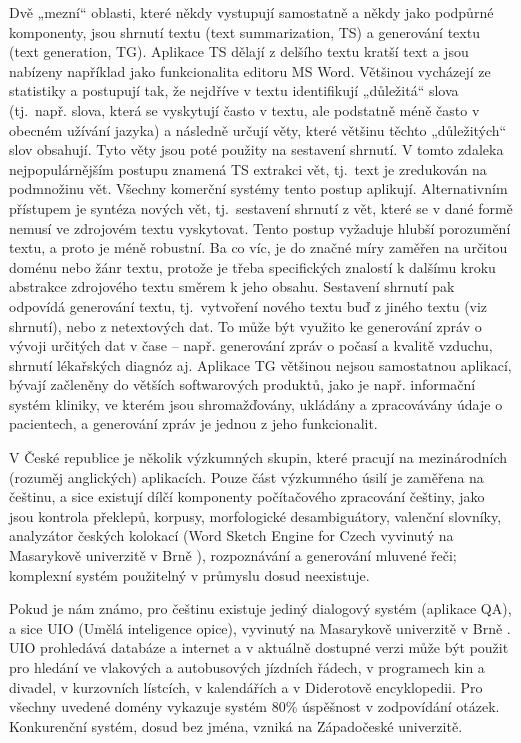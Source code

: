 \begin{multicols}{2}
Dvě „mezní“ oblasti, které někdy vystupují samostatně a někdy jako podpůrné komponenty, jsou shrnutí textu (text summarization, TS) a generování textu (text generation, TG). Aplikace TS dělají z delšího textu kratší text a jsou nabízeny například jako funkcionalita editoru MS Word. Většinou vycházejí ze statistiky a postupují tak, že nejdříve v textu identifikují „důležitá“ slova (tj.~např. slova, která se vyskytují často v textu, ale podstatně méně často v obecném užívání jazyka) a následně určují věty, které většinu těchto „důležitých“ slov obsahují. Tyto věty jsou poté použity na sestavení shrnutí. V tomto zdaleka nejpopulárnějším postupu znamená TS extrakci vět, tj.~text je zredukován na podmnožinu vět. Všechny komerční systémy tento postup aplikují.
Alternativním přístupem je syntéza nových vět, tj.~sestavení shrnutí z vět, které se v dané formě nemusí ve zdrojovém textu vyskytovat. Tento postup vyžaduje hlubší porozumění textu, a proto je méně robustní. Ba co víc, je do značné míry zaměřen na určitou doménu nebo žánr textu, protože je třeba specifických znalostí k dalšímu kroku abstrakce zdrojového textu směrem k jeho obsahu. Sestavení shrnutí pak odpovídá generování textu, tj.~vytvoření nového textu buď z jiného textu (viz shrnutí), nebo z netextových dat. To může být využito ke generování zpráv o vývoji určitých dat v čase -- např. generování zpráv o počasí a kvalitě vzduchu, shrnutí lékařských diagnóz aj. Aplikace TG většinou nejsou samostatnou aplikací, bývají začleněny do větších softwarových produktů, jako je např. informační systém kliniky, ve kterém jsou shromažďovány, ukládány a zpracovávány údaje o pacientech, a generování zpráv je jednou z jeho funkcionalit.

V České republice je několik výzkumných skupin, které pracují na mezinárodních (rozuměj anglických) aplikacích. Pouze část výzkumného úsilí je zaměřena na češtinu, a sice existují dílčí komponenty počítačového zpracování češtiny, jako jsou kontrola překlepů, korpusy, morfologické desambiguátory, valenční slovníky, analyzátor českých kolokací (Word Sketch Engine for Czech vyvinutý na Masarykově univerzitě v Brně \cite{Horak2009}), rozpoznávání a generování mluvené řeči; komplexní systém použitelný v průmyslu dosud neexistuje.

Pokud je nám známo, pro češtinu existuje jediný dialogový systém (aplikace QA), a sice UIO (Umělá inteligence opice), vyvinutý na Masarykově univerzitě v Brně \cite{Svoboda2003}. UIO prohledává databáze a internet a v aktuálně dostupné verzi může být použit pro hledání ve vlakových a autobusových jízdních řádech, v programech kin a divadel, v kurzovních lístcích, v kalendářích a v Diderotově encyklopedii. Pro všechny uvedené domény vykazuje systém 80\% úspěšnost v zodpovídání otázek. Konkurenční systém, dosud bez jména, vzniká na Západočeské univerzitě.


\end{multicols}
